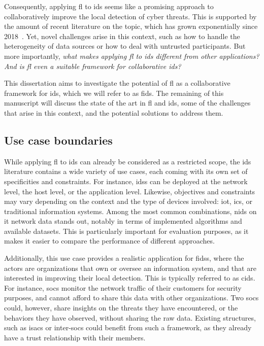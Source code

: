 Consequently, applying \gls{fl} to \gls{ids} seems like a promising approach to collaboratively improve the local detection of cyber threats.
This is supported by the amount of recent literature on the topic, which has grown exponentially since 2018~\cite{lavaur_tnsm_2022,ismaila_ReviewApproachesFederated_2024}.
Yet, novel challenges arise in this context, such as how to handle the heterogeneity of data sources or how to deal with untrusted participants.
But more importantly, \emph{what makes applying \gls{fl} to \gls{ids} different from other applications? And is \gls{fl} even a suitable framework for collaborative \gls{ids}?}

This dissertation aims to investigate the potential of \acrlong{fl} as a collaborative framework for \acrlong{ids}, which we will refer to as \gls{fids}.
The remaining of this manuscript will discuss the state of the art in \gls{fl} and \gls{ids}, some of the challenges that arise in this context, and the potential solutions to address them.


\subsection{Use case boundaries\label{sec:intro.context.usecase}}

While applying \gls{fl} to \gls{ids} can already be considered as a restricted scope, the \gls{ids} literature contains a wide variety of use cases, each coming with its own set of specificities and constraints.
For instance, \glspl{ids} can be deployed at the network level, the host level, or the application level.
Likewise, objectives and constraints may vary depending on the context and the type of devices involved: \gls{iot}, \gls{ics}, or traditional information systems.
Among the most common combinations, \gls{nids} on \gls{it} network data stands out, notably in terms of implemented algorithms and available datasets.
This is particularly important for evaluation purposes, as it makes it easier to compare the performance of different approaches.

Additionally, this use case provides a realistic application for \glspl{fids}, where the actors are organizations that own or oversee an information system, and that are interested in improving their local detection.
This is typically referred to as \gls{cids}.
For instance, \glspl{soc} monitor the network traffic of their customers for security purposes, and cannot afford to share this data with other organizations.
Two \glspl{soc} could, however, share insights on the threats they have encountered, or the behaviors they have observed, without sharing the raw data.
Existing structures, such as \glspl{isac} or inter-\glspl{soc} could benefit from such a framework, as they already have a trust relationship with their members.


